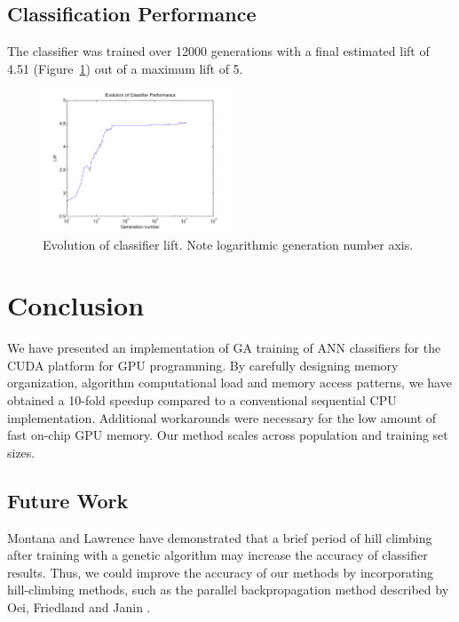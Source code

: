 \documentclass[11pt]{article}       %
\begin{document}
\subsection{Classification Performance} \label{results}
The classifier was trained over 12000 generations with a final estimated lift of 4.51 (Figure~\ref{fig:evolution-lift}) out of a maximum lift of 5.

\begin{figure}[h]
	\centering
	\includegraphics[width=0.5\textwidth]{fig-evolution-lift}
	\caption{Evolution of classifier lift. Note logarithmic generation number axis.}
	\label{fig:evolution-lift}
\end{figure}

\section{Conclusion} \label{concl}
We have presented an implementation of GA training of ANN classifiers for the CUDA platform for GPU programming. By carefully designing memory organization, algorithm computational load and memory access patterns, we have obtained a 10-fold speedup compared to a conventional sequential CPU implementation. Additional workarounds were necessary for the low amount of fast on-chip GPU memory. Our method scales across population and training set sizes.

\subsection{Future Work} \label{future}
Montana and Lawrence \cite{GA-ANN} have demonstrated that a brief period of hill climbing after training with a genetic algorithm may increase the accuracy of classifier results. Thus, we could improve the accuracy of our methods by incorporating hill-climbing methods, such as the parallel backpropagation method described by Oei, Friedland and Janin \cite{backprop}.




\end{document}

